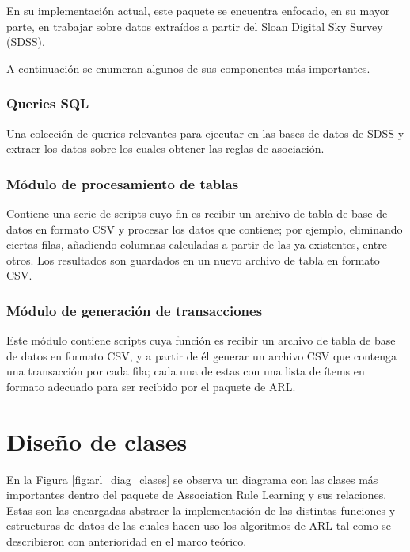En su implementación actual, este paquete se encuentra enfocado, en su mayor parte, en trabajar sobre datos extraídos a partir del Sloan Digital Sky Survey (SDSS).

A continuación se enumeran algunos de sus componentes más importantes.

\subsubsection{Queries SQL}

Una colección de queries relevantes para ejecutar en las bases de datos de SDSS y extraer los datos sobre los cuales obtener las reglas de asociación.

\subsubsection{Módulo de procesamiento de tablas}

Contiene una serie de scripts cuyo fin es recibir un archivo de tabla de base de datos en formato CSV y procesar los datos que contiene; por ejemplo, eliminando ciertas filas, añadiendo columnas calculadas a partir de las ya existentes, entre otros. Los resultados son guardados en un nuevo archivo de tabla en formato CSV.

\subsubsection{Módulo de generación de transacciones}

Este módulo contiene scripts cuya función es recibir un archivo de tabla de base de datos en formato CSV, y a partir de él generar un archivo CSV que contenga una transacción por cada fila; cada una de estas con una lista de ítems en formato adecuado para ser recibido por el paquete de ARL.

\section{Diseño de clases}

En la Figura \ref{fig:arl_diag_clases} se observa un diagrama con las clases más importantes dentro del paquete de Association Rule Learning y sus relaciones. Estas son las encargadas abstraer la implementación de las distintas funciones y estructuras de datos de las cuales hacen uso los algoritmos de ARL tal como se describieron con anterioridad en el marco teórico.

